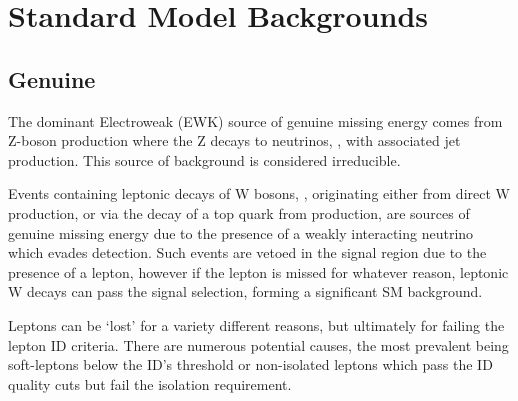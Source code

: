 
\section{Standard Model Backgrounds}
\subsection{Genuine \met}
The dominant Electroweak (EWK) source of genuine missing energy comes from
Z-boson production where the Z decays
to neutrinos, \zinv, with associated jet production. This source of background
is considered irreducible.

Events containing leptonic decays of W bosons, \wlnu, originating either
from direct W production, or via the decay of a top quark from \ttbar 
production, are sources of genuine 
missing energy due to the presence of a weakly interacting neutrino which
evades detection. Such events are vetoed in the signal
region due to the presence of a 
lepton, however if the lepton is missed for whatever reason, leptonic W decays 
can pass the signal selection, forming a significant SM background.


Leptons can be `lost' for a variety different reasons, but ultimately for failing
the lepton ID criteria. There are numerous potential causes, the 
most prevalent being soft-leptons below the ID's \Pt threshold or non-isolated
leptons
which pass the ID quality cuts but fail the isolation requirement.



